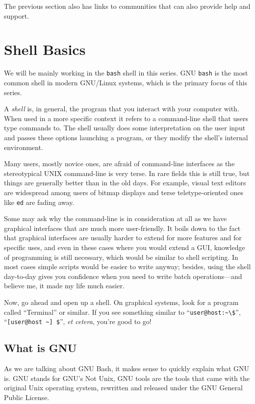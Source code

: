 \documentclass{extbook}
\begin{document}
The previous section also has links to communities that can also provide help and support.


\chapter{Shell Basics}

We will be mainly working in the \texttt{bash} shell in this series. GNU \texttt{bash} is the most common shell in modern GNU/Linux systems, which is the primary focus of this series.

A \textit{shell} is, in general, the program that you interact with your computer with. When used in a more specific context it refers to a command-line shell that users type commands to. The shell usually does some interpretation on the user input and passes these options launching a program, or they modify the shell's internal environment.

Many users, mostly novice ones, are afraid of command-line interfaces as the stereotypical UNIX command-line is very terse. In rare fields this is still true, but things are generally better than in the old days. For example, visual text editors are widespread among users of bitmap displays and terse teletype-oriented ones like \texttt{ed} are fading away.

Some may ask why the command-line is in consideration at all as we have graphical interfaces that are much more user-friendly. It boils down to the fact that graphical interfaces are usually harder to extend for more features and for specific uses, and even in these cases where you would extend a GUI, knowledge of programming is still necessary, which would be similar to shell scripting. In most cases simple scripts would be easier to write anyway; besides, using the shell day-to-day gives you confidence when you need to write batch operations---and believe me, it made my life much easier.

Now, go ahead and open up a shell. On graphical systems, look for a program called ``Terminal'' or similar. If you see something similar to ``\verb|user@host:~\$|'', ``\verb|[user@host ~] $|'', \textit{et cetera}, you're good to go!

\section{What is GNU}

As we are talking about GNU Bash, it makes sense to quickly explain what GNU is. GNU stands for GNU's Not Unix,  GNU tools are the tools that came with the original Unix operating system, rewritten and released under the GNU General Public License.
\end{document}
